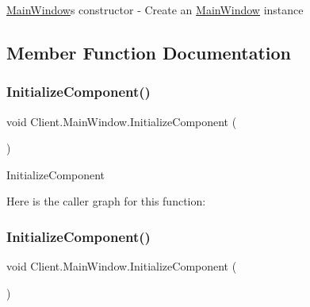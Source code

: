 \hyperlink{class_client_1_1_main_window}{Main\+Window}\textquotesingle{}s constructor -\/ Create an \hyperlink{class_client_1_1_main_window}{Main\+Window} instance 

\subsection{Member Function Documentation}
\mbox{\label{class_client_1_1_main_window_a13154f295003703f3da565f38915a536}} 
\subsubsection{\texorpdfstring{Initialize\+Component()}{InitializeComponent()}\hspace{0.1cm}{\footnotesize\ttfamily [1/3]}}
{\footnotesize\ttfamily void Client.\+Main\+Window.\+Initialize\+Component (\begin{DoxyParamCaption}{ }\end{DoxyParamCaption})\hspace{0.3cm}{\ttfamily [inline]}}



Initialize\+Component 

Here is the caller graph for this function\+:
\mbox{\label{class_client_1_1_main_window_a13154f295003703f3da565f38915a536}} 
\subsubsection{\texorpdfstring{Initialize\+Component()}{InitializeComponent()}\hspace{0.1cm}{\footnotesize\ttfamily [2/3]}}
{\footnotesize\ttfamily void Client.\+Main\+Window.\+Initialize\+Component (\begin{DoxyParamCaption}{ }\end{DoxyParamCaption})\hspace{0.3cm}{\ttfamily [inline]}}



